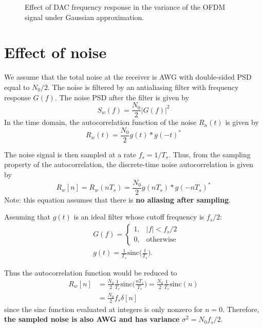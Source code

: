 \documentclass[a4paper]{article}
\begin{document}
\FloatBarrier
\begin{figure}[h!]
	\centering
	\resizebox{\linewidth}{!}{}
	\caption{Effect of DAC frequency response in the variance of the OFDM signal under Gaussian approximation.}
\end{figure}
\FloatBarrier

\section{Effect of noise}

We assume that the total noise at the receiver is AWG with double-sided PSD equal to $N_0/2$. The noise is filtered by an antialiasing filter with frequency response $G(f)$. The noise PSD after the filter is given by
\begin{equation}
S_w(f) = \frac{N_0}{2}|G(f)|^2
\end{equation}
In the time domain, the autocorrelation function of the noise $R_n(t)$ is given by
\begin{equation}
R_w(t) = \frac{N_0}{2}g(t)*g(-t)^*
\end{equation}

The noise signal is then sampled at a rate $f_s = 1/T_s$. Thus, from the sampling property of the autocorrelation, the discrete-time noise autocorrelation is given by
\begin{equation}
R_w[n] = R_w(nT_s) = \frac{N_0}{2}g(nT_s)*g(-nT_s)^*
\end{equation}
Note: this equation assumes that there is \textbf{no aliasing after sampling}.

Assuming that $g(t)$ is an ideal filter whose cutoff frequency is $f_s/2$:
\begin{align}
& G(f) = \begin{cases}
1, & |f| < f_s/2 \\
0, & \mathrm{otherwise}
\end{cases} \\
& g(t) = \frac{1}{T_s}\mathrm{sinc}\Big(\frac{t}{T_s}\Big).
\end{align}

Thus the autocorrelation function would be reduced to
\begin{align} \nonumber
R_w[n] & = \frac{N_0}{2}\frac{1}{T_s}\mathrm{sinc}\Big(\frac{nT_s}{T_s}\Big) = \frac{N_0}{2}\frac{1}{T_s}\mathrm{sinc}(n) \\  
& = \frac{N_0}{2}f_s\delta[n]
\end{align}
since the sinc function evaluated at integers is only nonzero for $n = 0$. Therefore, \textbf{the sampled noise is also AWG and has variance} $\sigma^2 = N_0f_s/2$. 
\end{document}
